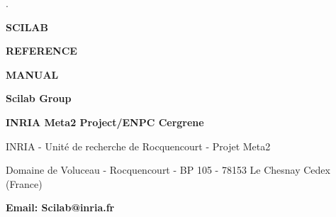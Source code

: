 
\def\Sdoc#1#2{\subsection{ #1: -----#2 \label{#1}}}
\def\SSdoc#1#2{\subsubsection{ #1: -----#2 \label{#1}}}
\newcommand{\bs}{$\backslash$}
\def\under{\underline}
\def\dotdot{\ddot}
\def\nwl{\hfill\break}          %

\def\vector#1{\left( \begin{array}{c} #1  \end{array}\right)}
\def\matrixq#1{\left( \begin{array}{cc} #1  \end{array}\right)}
\def\sciverb#1{\mbox{\tt #1}} 

\renewcommand{\cuttingunit}{subsection}. 
\setcounter{cuttingdepth}{0}
\makeindex 

%


\pagestyle{empty}

\vspace{8.cm}

{\Huge\bf SCILAB}

\bigskip

{\Huge\bf REFERENCE}

\bigskip

{\Huge\bf MANUAL}

\vspace{3.cm}

{\Huge\bf Scilab Group}

{\Large\bf
INRIA Meta2 Project/ENPC Cergrene}

\normalsize

\vspace{12.cm}

INRIA - Unit\'e de recherche de Rocquencourt - Projet Meta2

Domaine de Voluceau - Rocquencourt - BP 105 - 78153 Le Chesnay Cedex (France)

{\bf Email: Scilab@inria.fr}

%
\tableofcontents

\printindex

